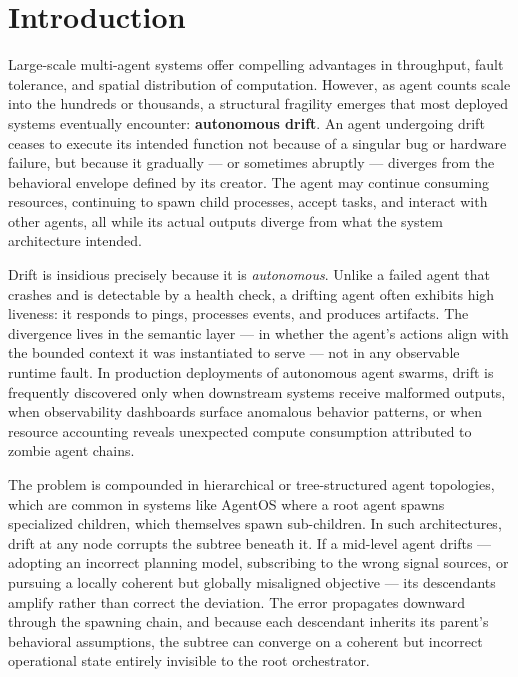 \section{Introduction}


Large-scale multi-agent systems offer compelling advantages in throughput, fault tolerance, and spatial distribution of computation. However, as agent counts scale into the hundreds or thousands, a structural fragility emerges that most deployed systems eventually encounter: \textbf{autonomous drift}. An agent undergoing drift ceases to execute its intended function not because of a singular bug or hardware failure, but because it gradually — or sometimes abruptly — diverges from the behavioral envelope defined by its creator. The agent may continue consuming resources, continuing to spawn child processes, accept tasks, and interact with other agents, all while its actual outputs diverge from what the system architecture intended.

Drift is insidious precisely because it is \textit{autonomous}. Unlike a failed agent that crashes and is detectable by a health check, a drifting agent often exhibits high liveness: it responds to pings, processes events, and produces artifacts. The divergence lives in the semantic layer — in whether the agent's actions align with the bounded context it was instantiated to serve — not in any observable runtime fault. In production deployments of autonomous agent swarms, drift is frequently discovered only when downstream systems receive malformed outputs, when observability dashboards surface anomalous behavior patterns, or when resource accounting reveals unexpected compute consumption attributed to zombie agent chains.

The problem is compounded in hierarchical or tree-structured agent topologies, which are common in systems like AgentOS where a root agent spawns specialized children, which themselves spawn sub-children. In such architectures, drift at any node corrupts the subtree beneath it. If a mid-level agent drifts — adopting an incorrect planning model, subscribing to the wrong signal sources, or pursuing a locally coherent but globally misaligned objective — its descendants amplify rather than correct the deviation. The error propagates downward through the spawning chain, and because each descendant inherits its parent's behavioral assumptions, the subtree can converge on a coherent but incorrect operational state entirely invisible to the root orchestrator.

